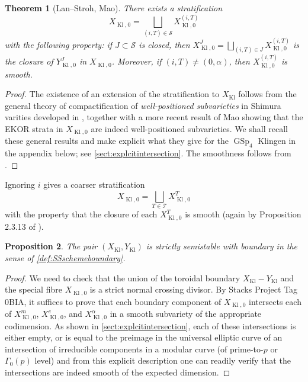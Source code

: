 \documentclass[cjm]{ipart}
\theoremstyle{plain}
\newtheorem{theorem}{Theorem}[subsection]
\newtheorem{proposition}[theorem]{Proposition}
\theoremstyle{remark}
\DeclareMathOperator{\GSp}{GSp}
\DeclareMathOperator{\Kl}{Kl}
\newcommand{\cS}{\mathcal{S}}
\numberwithin{equation}{subsection}
\begin{document}
  \begin{theorem}[Lan--Stroh, Mao]
   There exists a stratification
   \[ X_{\Kl, 0} = \bigsqcup_{(i, T) \in \mathcal{S}} X_{\Kl, 0}^{(i, T)} \]
   with the following property: if $J \subset \cS$ is closed, then $X^J_{\Kl, 0} = \bigsqcup_{(i, T) \in J} X_{\Kl, 0}^{(i, T)}$ is the closure of $Y^J_{\Kl, 0}$ in $X_{\Kl, 0}$. Moreover, if $(i, T) \ne (0, \alpha)$, then $X_{\Kl, 0}^{(i, T)}$ is smooth.
  \end{theorem}

  \begin{proof}
   The existence of an extension of the stratification to $X_{\Kl}$ follows from the general theory of compactification of \emph{well-positioned subvarieties} in Shimura varities developed in \cite{lanstroh}, together with a more recent result of Mao \cite[Theorem 1.1]{mao-preprint} showing that the EKOR strata in $X_{\Kl, 0}$ are indeed well-positioned subvarieties. We shall recall these general results and make explicit what they give for the $\GSp_4$ Klingen in the appendix below; see \cref{sect:explcitintersection}. The smoothness follows from \cite[Proposition 2.3.13]{lanstroh}.
  \end{proof}

  Ignoring $i$ gives a coarser stratification
  \[ X_{\Kl, 0} = \bigsqcup_{T \in \mathcal{T}} X_{\Kl, 0}^{T} \]
  with the property that the closure of each $X_{\Kl, 0}^{T}$ is smooth (again by Proposition 2.3.13 of \cite{lanstroh}).

  \begin{proposition}
   The pair $\left(X_{\Kl}, Y_{\Kl}\right)$ is \emph{strictly semistable with boundary} in the sense of \cref{def:SSschemeboundary}.
  \end{proposition}

  \begin{proof}
   We need to check that the union of the toroidal boundary $X_{\Kl}-Y_{\Kl}$ and the special fibre $X_{\Kl,0}$ is a strict normal crossing divisor. By Stacks Project Tag 0BIA, it suffices to prove that each boundary component of $X_{\Kl, 0}$ intersects each of $X_{\Kl, 0}^m$, $X_{\Kl, 0}^e$, and $X_{\Kl, 0}^{\alpha}$ in a smooth subvariety of the appropriate codimension. As shown in  \cref{sect:explcitintersection}, each of these intersections is either empty, or is equal to the preimage in the universal elliptic curve of an intersection of irreducible components in a modular curve (of prime-to-$p$ or $\Gamma_0(p)$ level) and from this explicit description one can readily verify that the intersections are indeed smooth of the expected dimension.
  \end{proof}
\end{document}
